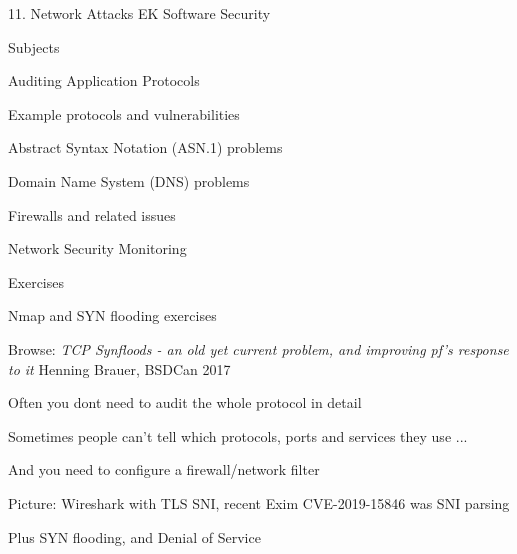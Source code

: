\documentclass[Screen16to9,17pt]{foils}
\begin{document}
\mytitlepage
{11. Network Attacks}
{EK  Software Security}



\begin{list1}
\item Subjects
\begin{list2}
\item Auditing Application Protocols
\item Example protocols and vulnerabilities
\item Abstract Syntax Notation (ASN.1) problems
\item Domain Name System (DNS) problems
\item Firewalls and related issues
\item Network Security Monitoring
\end{list2}
\item Exercises
\begin{list2}
\item Nmap and SYN flooding exercises
\end{list2}
\end{list1}


\begin{list1}
\item Browse: \emph{TCP Synfloods - an old yet current problem, and improving pf's response to it}
Henning Brauer, BSDCan 2017 
\end{list1}





\begin{list1}
\item Often you dont need to audit the whole protocol in detail
\item Sometimes people can't tell which protocols, ports and services they use ...
\item And you need to configure a firewall/network filter
\item Picture: Wireshark with TLS SNI, recent Exim CVE-2019-15846 was SNI parsing
\item Plus SYN flooding, and Denial of Service
\end{list1}
\end{document}
